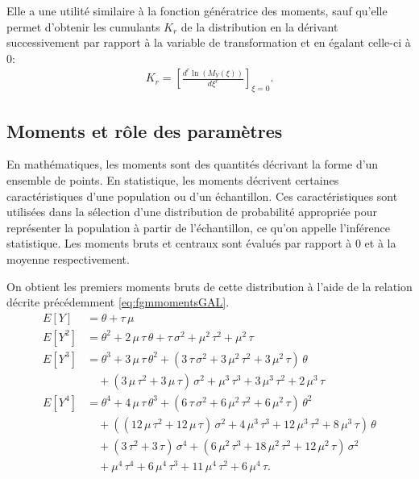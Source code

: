 Elle a une utilité similaire à la fonction génératrice des moments,
sauf qu'elle permet d'obtenir les cumulants $K_r$ de la distribution
en la dérivant successivement par rapport à la variable de
transformation et en égalant celle-ci à 0:
\begin{align}
  \label{eq:fgccumGAL}
  K_r = \left[ \frac{d^r \ln{(M_Y(\xi))}}{d\xi^r} \right]_{\xi=0}.
\end{align}

\subsection{Moments et rôle des paramètres}
\label{sec:momentsGAL}

En mathématiques, les moments sont des quantités décrivant la forme
d'un ensemble de points. En statistique, les moments décrivent
certaines caractéristiques d'une population ou d'un échantillon. Ces
caractéristiques sont utilisées dans la sélection d'une distribution
de probabilité appropriée pour représenter la population à partir de
l'échantillon, ce qu'on appelle l'inférence statistique. Les moments
bruts et centraux sont évalués par rapport à 0 et à la moyenne
respectivement.

On obtient les premiers moments bruts de cette distribution à l'aide
de la relation décrite précédemment \eqref{eq:fgmmomentsGAL}.
\begin{align*}
  E[Y] &= \theta+\tau\,\mu \\
  E[Y^2] &= {\theta}^{2}+2\,\mu\,\tau\,\theta+\tau\,{\sigma}^{2}+{\mu}^{2}\,{\tau}^{2}+{\mu}^{2}\,\tau \\
  E[Y^3] &= {\theta}^{3}+3\,\mu\,\tau\,{\theta}^{2}+\left( 3\,\tau\,{\sigma}^{2}+3\,{\mu}^{2}\,{\tau}^{2} +3\,{\mu}^{2}\,\tau\right) \,\theta \\
  &\quad + \left( 3\,\mu\,{\tau}^{2}+3\,\mu\,\tau\right) \,{\sigma}^{2}+{\mu}^{3}\,{\tau}^{3}+3\,{\mu}^{3}\,{\tau}^{2}+2\,{\mu}^{3}\,\tau \\
  E[Y^4] &= {\theta}^{4}+4\,\mu\,\tau\,{\theta}^{3}+\left( 6\,\tau\,{\sigma}^{2}+6\,{\mu}^{2}\,{\tau}^{2}+6\,{\mu}^{2}\,\tau\right) \,{\theta}^{2}\\
  &\quad+\left( \left( 12\,\mu\,{\tau}^{2}+12\,\mu\,\tau\right) \,{\sigma}^{2}+4\,{\mu}^{3}\,{\tau}^{3}+12\,{\mu}^{3}\,{\tau}^{2}+8\,{\mu}^{3}\,\tau\right) \,\theta \\
  &\quad+\left( 3\,{\tau}^{2}+3\,\tau\right) \,{\sigma}^{4}+\left(
    6\,{\mu}^{2}\,{\tau}^{3}+18\,{\mu}^{2}\,{\tau}^{2}+12\,{\mu}^{2}\,\tau\right)
  \,{\sigma}^{2} \\
  &\quad+{\mu}^{4}\,{\tau}^{4}+6\,{\mu}^{4}\,{\tau}^{3}+11\,{\mu}^{4}\,{\tau}^{2}+6\,{\mu}^{4}\,\tau.
\end{align*}

